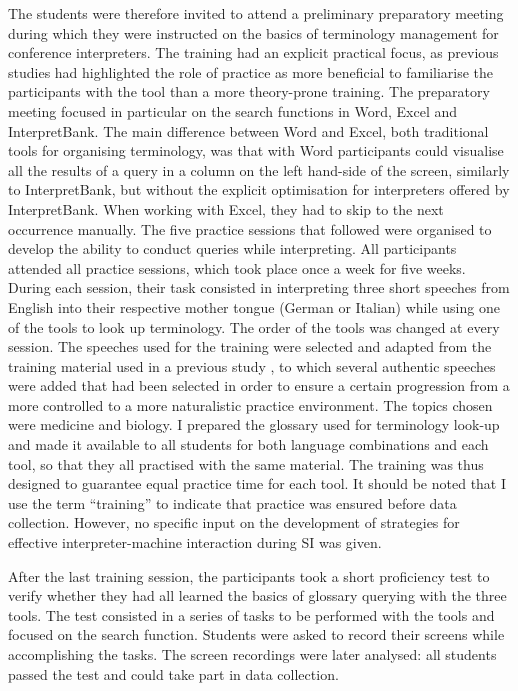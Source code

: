 The students were therefore invited to attend a preliminary preparatory meeting during which they were instructed on the basics of terminology management for conference interpreters. The training had an explicit practical focus, as previous studies \citep{prandi_uso_2015, prandi_use_2015} had highlighted the role of practice as more beneficial to familiarise the participants with the tool than a more theory-prone training. The preparatory meeting focused in particular on the search functions in Word, Excel and InterpretBank. The main difference between Word and Excel, both traditional tools for organising terminology, was that with Word participants could visualise all the results of a query in a column on the left hand-side of the screen, similarly to InterpretBank, but without the explicit optimisation for interpreters offered by InterpretBank. When working with Excel, they had to skip to the next occurrence manually. The five practice sessions that followed were organised to develop the ability to conduct queries while interpreting. All participants attended all practice sessions, which took place once a week for five weeks. During each session, their task consisted in interpreting three short speeches from English into their respective mother tongue (German or Italian) while using one of the tools to look up terminology. The order of the tools was changed at every session. The speeches used for the training were selected and adapted from the training material used in a previous study \citep{prandi_uso_2015, prandi_use_2015}, to which several authentic speeches were added that had been selected in order to ensure a certain progression from a more controlled to a more naturalistic practice environment. The topics chosen were medicine and biology. I prepared the glossary used for terminology look-up and made it available to all students for both language combinations and each tool, so that they all practised with the same material. The training was thus designed to guarantee equal practice time for each tool. It should be noted that I use the term ``training'' to indicate that practice was ensured before data collection. However, no specific input on the development of strategies for effective in\-ter\-pret\-er-ma\-chine interaction during SI was given.

After the last training session, the participants took a short proficiency test to verify whether they had all learned the basics of glossary querying with the three tools. The test consisted in a series of tasks to be performed with the tools and focused on the search function. Students were asked to record their screens while accomplishing the tasks. The screen recordings were later analysed: all students passed the test and could take part in data collection.


